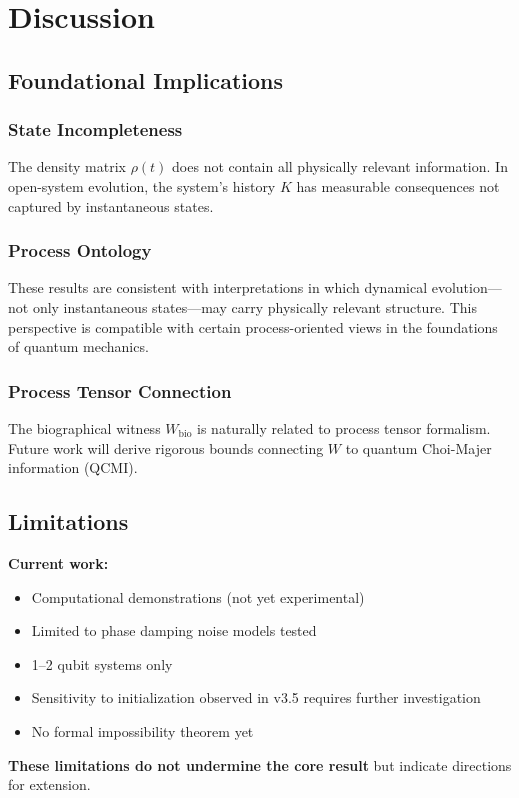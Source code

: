 \documentclass[11pt, onecolumn, letterpaper]{article}
\begin{document}
\section{Discussion}

\subsection{Foundational Implications}

\subsubsection{State Incompleteness}
The density matrix $\rho(t)$ does not contain all physically relevant information. In open-system evolution, the system's history $K$ has measurable consequences not captured by instantaneous states.

\subsubsection{Process Ontology}
These results are consistent with interpretations in which dynamical evolution—not only instantaneous states—may carry physically relevant structure. This perspective is compatible with certain process-oriented views in the foundations of quantum mechanics.


\subsubsection{Process Tensor Connection}
The biographical witness $W_{\text{bio}}$ is naturally related to process tensor formalism. Future work will derive rigorous bounds connecting $W$ to quantum Choi-Majer information (QCMI).

\subsection{Limitations}
\textbf{Current work:}
\begin{itemize}
    \item Computational demonstrations (not yet experimental)
    \item Limited to phase damping noise models tested
    \item 1--2 qubit systems only
    \item Sensitivity to initialization observed in v3.5 requires further investigation
    \item No formal impossibility theorem yet
\end{itemize}
\textbf{These limitations do not undermine the core result} but indicate directions for extension.
\end{document}
